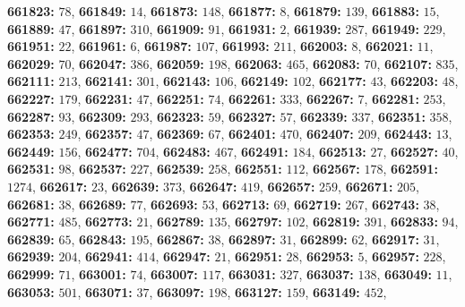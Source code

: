 \textsf{\bfseries 661823:} $78$, \textsf{\bfseries 661849:} $14$, \textsf{\bfseries 661873:} $148$, \textsf{\bfseries 661877:} $8$, \textsf{\bfseries 661879:} $139$, \textsf{\bfseries 661883:} $15$, \textsf{\bfseries 661889:} $47$, \textsf{\bfseries 661897:} $310$, \textsf{\bfseries 661909:} $91$, \textsf{\bfseries 661931:} $2$, \textsf{\bfseries 661939:} $287$, \textsf{\bfseries 661949:} $229$, \textsf{\bfseries 661951:} $22$, \textsf{\bfseries 661961:} $6$, \textsf{\bfseries 661987:} $107$, \textsf{\bfseries 661993:} $211$, \textsf{\bfseries 662003:} $8$, \textsf{\bfseries 662021:} $11$, \textsf{\bfseries 662029:} $70$, \textsf{\bfseries 662047:} $386$, \textsf{\bfseries 662059:} $198$, \textsf{\bfseries 662063:} $465$, \textsf{\bfseries 662083:} $70$, \textsf{\bfseries 662107:} $835$, \textsf{\bfseries 662111:} $213$, \textsf{\bfseries 662141:} $301$, \textsf{\bfseries 662143:} $106$, \textsf{\bfseries 662149:} $102$, \textsf{\bfseries 662177:} $43$, \textsf{\bfseries 662203:} $48$, \textsf{\bfseries 662227:} $179$, \textsf{\bfseries 662231:} $47$, \textsf{\bfseries 662251:} $74$, \textsf{\bfseries 662261:} $333$, \textsf{\bfseries 662267:} $7$, \textsf{\bfseries 662281:} $253$, \textsf{\bfseries 662287:} $93$, \textsf{\bfseries 662309:} $293$, \textsf{\bfseries 662323:} $59$, \textsf{\bfseries 662327:} $57$, \textsf{\bfseries 662339:} $337$, \textsf{\bfseries 662351:} $358$, \textsf{\bfseries 662353:} $249$, \textsf{\bfseries 662357:} $47$, \textsf{\bfseries 662369:} $67$, \textsf{\bfseries 662401:} $470$, \textsf{\bfseries 662407:} $209$, \textsf{\bfseries 662443:} $13$, \textsf{\bfseries 662449:} $156$, \textsf{\bfseries 662477:} $704$, \textsf{\bfseries 662483:} $467$, \textsf{\bfseries 662491:} $184$, \textsf{\bfseries 662513:} $27$, \textsf{\bfseries 662527:} $40$, \textsf{\bfseries 662531:} $98$, \textsf{\bfseries 662537:} $227$, \textsf{\bfseries 662539:} $258$, \textsf{\bfseries 662551:} $112$, \textsf{\bfseries 662567:} $178$, \textsf{\bfseries 662591:} $1274$, \textsf{\bfseries 662617:} $23$, \textsf{\bfseries 662639:} $373$, \textsf{\bfseries 662647:} $419$, \textsf{\bfseries 662657:} $259$, \textsf{\bfseries 662671:} $205$, \textsf{\bfseries 662681:} $38$, \textsf{\bfseries 662689:} $77$, \textsf{\bfseries 662693:} $53$, \textsf{\bfseries 662713:} $69$, \textsf{\bfseries 662719:} $267$, \textsf{\bfseries 662743:} $38$, \textsf{\bfseries 662771:} $485$, \textsf{\bfseries 662773:} $21$, \textsf{\bfseries 662789:} $135$, \textsf{\bfseries 662797:} $102$, \textsf{\bfseries 662819:} $391$, \textsf{\bfseries 662833:} $94$, \textsf{\bfseries 662839:} $65$, \textsf{\bfseries 662843:} $195$, \textsf{\bfseries 662867:} $38$, \textsf{\bfseries 662897:} $31$, \textsf{\bfseries 662899:} $62$, \textsf{\bfseries 662917:} $31$, \textsf{\bfseries 662939:} $204$, \textsf{\bfseries 662941:} $414$, \textsf{\bfseries 662947:} $21$, \textsf{\bfseries 662951:} $28$, \textsf{\bfseries 662953:} $5$, \textsf{\bfseries 662957:} $228$, \textsf{\bfseries 662999:} $71$, \textsf{\bfseries 663001:} $74$, \textsf{\bfseries 663007:} $117$, \textsf{\bfseries 663031:} $327$, \textsf{\bfseries 663037:} $138$, \textsf{\bfseries 663049:} $11$, \textsf{\bfseries 663053:} $501$, \textsf{\bfseries 663071:} $37$, \textsf{\bfseries 663097:} $198$, \textsf{\bfseries 663127:} $159$, \textsf{\bfseries 663149:} $452$, 
